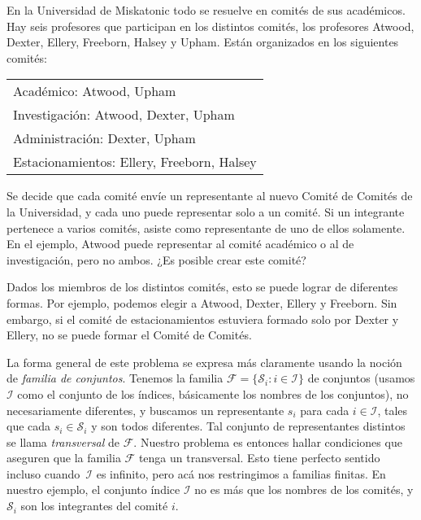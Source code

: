   \begin{example}
    En la Universidad de Miskatonic
    todo se resuelve en comités de sus académicos.
    Hay seis profesores que participan en los distintos comités,
    los profesores Atwood, Dexter, Ellery, Freeborn, Halsey y Upham.
    Están organizados en los siguientes comités:

    \begin{tabular}[c]{l}
      Académico: Atwood, Upham \\
      Investigación: Atwood, Dexter, Upham \\
      Administración: Dexter, Upham \\
      Estacionamientos: Ellery, Freeborn, Halsey
    \end{tabular}

    \noindent
    Se decide que cada comité envíe un representante
    al nuevo Comité de Comités de la Universidad,
    y cada uno puede representar solo a un comité.
    Si un integrante pertenece a varios comités,
    asiste como representante de uno de ellos solamente.
    En el ejemplo,
    Atwood puede representar al comité académico
    o al de investigación,
    pero no ambos.
    ¿Es posible crear este comité?

    Dados los miembros de los distintos comités,
    esto se puede lograr de diferentes formas.
    Por ejemplo,
    podemos elegir a Atwood, Dexter, Ellery y Freeborn.
    Sin embargo,
    si el comité de estacionamientos
    estuviera formado solo por Dexter y Ellery,
    no se puede formar el Comité de Comités.
  \end{example}

  La forma general de este problema se expresa más claramente
  usando la noción de \emph{familia de conjuntos}.%
  Tenemos la familia
    \(\mathcal{F} = \{\mathcal{S}_i \colon i \in \mathcal{I}\}\)
  de conjuntos
  (usamos \(\mathcal{I}\) como el conjunto de los índices,
   básicamente los nombres de los conjuntos),
  no necesariamente diferentes,
  y buscamos un representante \(s_i\)
  para cada \(i \in \mathcal{I}\),
  tales que cada \(s_i \in \mathcal{S}_i\)
  y son todos diferentes.
  Tal conjunto de representantes distintos
  se llama \emph{transversal} de \(\mathcal{F}\).
  Nuestro problema es entonces hallar condiciones
  que aseguren que la familia \(\mathcal{F}\) tenga un transversal.
  Esto tiene perfecto sentido
  incluso cuando~\(\mathcal{I}\) es infinito,
  pero acá nos restringimos a familias finitas.
  En nuestro ejemplo,
  el conjunto índice \(\mathcal{I}\)
  no es más que los nombres de los comités,
  y \(\mathcal{S}_i\) son los integrantes del comité \(i\).

